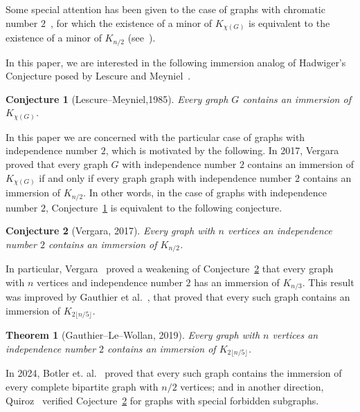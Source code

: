 \documentclass[a4paper,12pt]{article}
\newtheorem{theorem}{Theorem}
\newtheorem{conjecture}{Conjecture}
\begin{document}
Some special attention has been given to the case of graphs with chromatic number \(2\)~\cite{seymour2016hadwiger},
for which the existence of a minor of \(K_{\chi(G)}\) is equivalent to the existence of a minor of \(K_{n/2}\) (see~\cite{plummer2003special}).

In this paper, we are interested in the following immersion analog of Hadwiger's Conjecture posed by Lescure and Meyniel~\cite{lescure41problem}.

\begin{conjecture}[Lescure--Meyniel,1985]\label{conj:LescureMeyniel}
	Every graph \(G\) contains an immersion of \(K_{\chi(G)}\).
\end{conjecture}

In this paper we are concerned with the particular case of graphs with independence number \(2\),
which is motivated by the following.
In 2017, Vergara~\cite{vergara2017complete} proved that every graph \(G\) with independence number \(2\)
contains an immersion of \(K_{\chi(G)}\) if and only if every graph graph with independence number \(2\) contains an immersion of \(K_{n/2}\). 
In other words, in the case of graphs with independence number \(2\),
Conjecture~\ref{conj:LescureMeyniel} is equivalent to the following conjecture.


\begin{conjecture}[Vergara, 2017]\label{conj:vergara}
	Every graph with \(n\) vertices an independence number \(2\)
	contains an immersion of \(K_{n/2}\).
\end{conjecture}

In particular, Vergara~\cite{vergara2017complete} proved a weakening of Conjecture~\ref{conj:vergara} that every graph with \(n\) vertices and independence number \(2\)
has an immersion of \(K_{n/3}\).
This result was improved by Gauthier et al.~\cite{gauthier2019forcing},
that proved that every such graph contains an immersion of \(K_{2\lfloor n/5\rfloor}\).

\begin{theorem}[Gauthier--Le--Wollan, 2019]\label{thm:gauthier}
	Every graph with \(n\) vertices an independence number \(2\)
	contains an immersion of \(K_{2\lfloor n/5\rfloor}\).
\end{theorem}

In 2024, Botler et. al.~\cite{botler2024biclique} proved that every such graph
contains the immersion of every complete bipartite graph with \(n/2\) vertices;
and in another direction, Quiroz~\cite{quiroz2021clique} verified Cojecture~\ref{conj:vergara} for graphs with special forbidden subgraphs.
\end{document}
